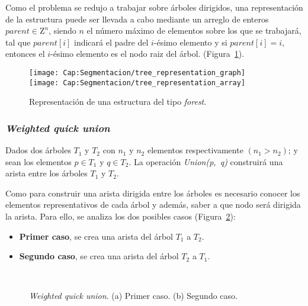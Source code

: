 Como el problema se redujo a trabajar sobre árboles dirigidos, una 
representación de la estructura puede ser llevada a cabo mediante un arreglo
de enteros $parent \in \mathrm{Z}^n$, siendo $n$ el número máximo de elementos
sobre los que se trabajará, tal que $parent[i]$ indicará el padre del 
$i$-ésimo elemento y  si $parent[i] = i$, entonces el $i$-ésimo elemento es el
nodo raiz del árbol. 
(Figura~\ref{fig:cap-segmentacion:forest_representacion}).

\begin{figure}[h!]
  \centering
  \texttt{[image: Cap:Segmentacion/tree\_representation\_graph]}\\
  \texttt{[image: Cap:Segmentacion/tree\_representation\_array]}
	\caption{Representación de una estructura del tipo \textit{forest}.}
	\label{fig:cap-segmentacion:forest_representacion}
\end{figure}

\subsubsection{\textit{Weighted quick union}}
Dados dos árboles $T_1$ y $T_2$ con $n_1$ y $n_2$ elementos respectivamente 
$(n_1 > n_2)$; y sean los elementos $p \in T_1$ y $q \in T_2$. La operación
\textit{Union(p,~q)} construirá una arista entre los árboles $T_1$ y $T_2$. 

Como para construir una arista dirigida entre los árboles es necesario conocer
los elementos representativos de cada árbol y además, saber a que nodo será
dirigida la arista. Para ello, se analiza los dos posibles casos
(Figura~\ref{fig:cap-segmentacion:UF_weight}):
\begin{itemize}
	\item \textbf{Primer caso}, se crea una arista del árbol $T_1$ a $T_2$.
	\item \textbf{Segundo caso}, se crea una arista del árbol $T_2$ a $T_1$.
\end{itemize}
\begin{figure}[h!]
  \centering
	 { \, \, \, \, }
   \\ 
	\caption[\textit{Weighted quick union}]{\textit{Weighted quick union}. 
	(a) Primer caso. (b) Segundo caso.}
	\label{fig:cap-segmentacion:UF_weight}
\end{figure}

